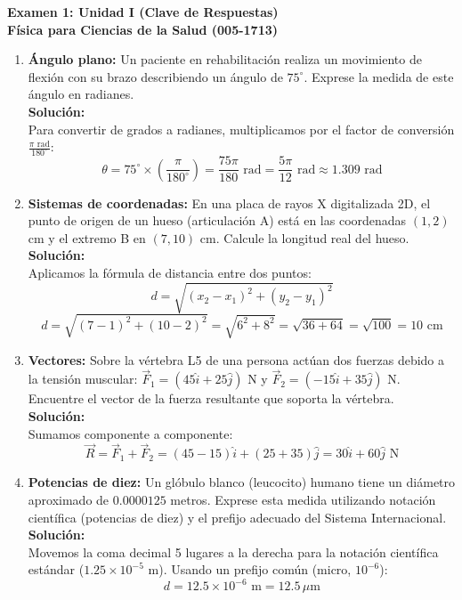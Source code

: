 \documentclass[12pt,letterpaper]{article}
\begin{document}
\begin{center}
    \textbf{\Large Examen 1: Unidad I (Clave de Respuestas)}\\
    \vspace{0.2cm}
    \textbf{Física para Ciencias de la Salud (005-1713)}\\
\end{center}

\vspace{0.5cm}

\begin{enumerate}

    \item \textbf{Ángulo plano:} Un paciente en rehabilitación realiza un movimiento de flexión con su brazo describiendo un ángulo de $75^\circ$. Exprese la medida de este ángulo en radianes. \\
    \textbf{Solución:} \\
    Para convertir de grados a radianes, multiplicamos por el factor de conversión $\frac{\pi \text{ rad}}{180^\circ}$:
    \[ \theta = 75^\circ \times \left( \frac{\pi}{180^\circ} \right) = \frac{75\pi}{180} \text{ rad} = \frac{5\pi}{12} \text{ rad} \approx 1.309 \text{ rad} \]

    \item \textbf{Sistemas de coordenadas:} En una placa de rayos X digitalizada 2D, el punto de origen de un hueso (articulación A) está en las coordenadas $(1, 2)$ cm y el extremo B en $(7, 10)$ cm. Calcule la longitud real del hueso. \\
    \textbf{Solución:} \\
    Aplicamos la fórmula de distancia entre dos puntos:
    \[ d = \sqrt{(x_2 - x_1)^2 + (y_2 - y_1)^2} \]
    \[ d = \sqrt{(7 - 1)^2 + (10 - 2)^2} = \sqrt{6^2 + 8^2} = \sqrt{36 + 64} = \sqrt{100} = 10 \text{ cm} \]
    
    \item \textbf{Vectores:} Sobre la vértebra L5 de una persona actúan dos fuerzas debido a la tensión muscular: $\vec{F}_1 = (45\hat{i} + 25\hat{j})$ N y $\vec{F}_2 = (-15\hat{i} + 35\hat{j})$ N. Encuentre el vector de la fuerza resultante que soporta la vértebra. \\
    \textbf{Solución:} \\
    Sumamos componente a componente:
    \[ \vec{R} = \vec{F}_1 + \vec{F}_2 = (45 - 15)\hat{i} + (25 + 35)\hat{j} = 30\hat{i} + 60\hat{j} \text{ N} \]
    
    \item \textbf{Potencias de diez:} Un glóbulo blanco (leucocito) humano tiene un diámetro aproximado de $0.0000125$ metros. Exprese esta medida utilizando notación científica (potencias de diez) y el prefijo adecuado del Sistema Internacional. \\
    \textbf{Solución:} \\
    Movemos la coma decimal 5 lugares a la derecha para la notación científica estándar ($1.25 \times 10^{-5}$ m). Usando un prefijo común (micro, $10^{-6}$):
    \[ d = 12.5 \times 10^{-6} \text{ m} = 12.5 \, \mu\text{m} \]


\end{enumerate}
\end{document}
